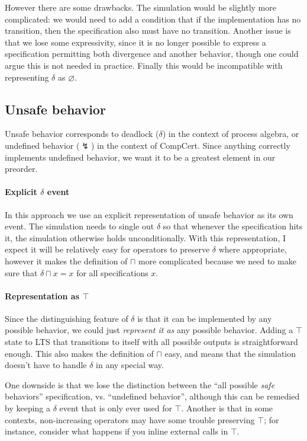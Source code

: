 \documentclass[11pt]{article}
\begin{document}
However there are some drawbacks.
The simulation would be slightly more complicated:
we would need to add a condition that
if the implementation has no transition,
then the specification also must have no transition.
Another issue is that we lose some expressivity,
since it is no longer possible to express a specification
permitting both divergence and another behavior,
though one could argue this is not needed in practice.
Finally this would be incompatible with
representing $\delta$ as $\varnothing$.


\subsection{Unsafe behavior} %

Unsafe behavior
corresponds to deadlock ($\delta$) in the context of process algebra,
or undefined behavior ($\lightning$) in the context of CompCert.
Since anything correctly implements undefined behavior,
we want it to be a greatest element in our preorder.

\paragraph{Explicit $\delta$ event}

In this approach we use an explicit representation of
unsafe behavior as its own event.
The simulation needs to single out $\delta$
so that whenever the specification hits it,
the simulation otherwise holds unconditionally.
With this representation,
I expect it will be relatively easy
for operators to preserve $\delta$ where appropriate,
however it makes the definition of $\sqcap$
more complicated because we need to make sure that
$\delta \sqcap x = x$ for all specifications $x$.

\paragraph{Representation as $\top$}

Since the distinguishing feature of $\delta$ is that
it can be implemented by any possible behavior,
we could just \emph{represent it as} any possible behavior.
Adding a $\top$ state to LTS that transitions to itself
with all possible outputs is straightforward enough.
This also makes the definition of $\sqcap$ easy,
and means that the simulation doesn't have to handle $\delta$
in any special way.

One downside is that we lose the distinction between
the ``all possible \emph{safe} behaviors'' specification,
vs. ``undefined behavior'',
although this can be remedied by keeping a $\delta$ event
that is only ever used for $\top$.
Another is that in some contexts,
non-increasing operators 
may have some trouble preserving $\top$;
for instance, consider what happens if you
inline external calls in $\top$.
\end{document}
